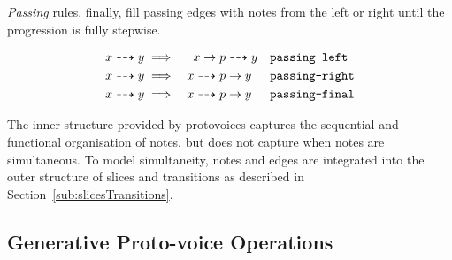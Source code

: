 \documentclass[12pt,a4paper,twoside,openany]{report} \usepackage[pdfborder={0 0 0}]{hyperref}    %
\theoremstyle{definition} \newtheorem{definition}{Definition}[section]
\begin{document}
\textit{Passing} rules, finally, fill passing edges with notes from the left or right until the progression is fully stepwise.

\begin{equation} 
  \begin{aligned} 
    x \dashrightarrow y &\implies &x \to p &\dashrightarrow y && \text{\texttt{passing-left}} \\ 
    x \dashrightarrow y &\implies &x \dashrightarrow p &\to y && \text{\texttt{passing-right}} \\
    x \dashrightarrow y &\implies &x \dashrightarrow p &\to y && \text{\texttt{passing-final}} \\ 
\end{aligned}  
\end{equation}

%

The inner structure provided by protovoices captures the sequential and functional organisation of notes, but does not
capture when notes are simultaneous. To model simultaneity, notes and edges are integrated into the outer structure of
slices and transitions as described in Section~\ref{sub:slicesTransitions}. 

\subsection{Generative Proto-voice Operations}
\label{sub:pvOps}
\end{document}
